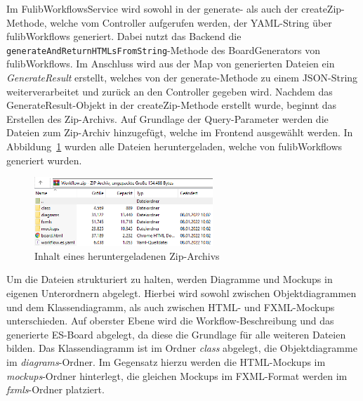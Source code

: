 Im FulibWorkflowsService wird sowohl in der generate- als auch der createZip-Methode, welche vom Controller aufgerufen werden,
der YAML-String über fulibWorkflows generiert.
Dabei nutzt das Backend die \texttt{generateAndReturnHTMLsFromString}-Methode des BoardGenerators von fulibWorkflows.
Im Anschluss wird aus der Map von generierten Dateien ein \textit{GenerateResult} erstellt, welches von der generate-Methode zu einem JSON-String weiterverarbeitet und zurück an den Controller gegeben wird.
Nachdem das GenerateResult-Objekt in der createZip-Methode erstellt wurde, beginnt das Erstellen des Zip-Archivs.
Auf Grundlage der Query-Parameter werden die Dateien zum Zip-Archiv hinzugefügt, welche im Frontend ausgewählt werden.
In Abbildung~\ref{fig:export} wurden alle Dateien heruntergeladen, welche von fulibWorkflows generiert wurden.

\begin{figure}[h]
    \centering
    \includegraphics[width=0.6\textwidth]{images/3.3/export}
    \caption{Inhalt eines heruntergeladenen Zip-Archivs}
    \label{fig:export}
\end{figure}

Um die Dateien strukturiert zu halten, werden Diagramme und Mockups in eigenen Unterordnern abgelegt.
Hierbei wird sowohl zwischen Objektdiagrammen und dem Klassendiagramm, als auch zwischen HTML- und FXML-Mockups unterschieden.
Auf oberster Ebene wird die Workflow-Beschreibung und das generierte \ac{ES}-Board abgelegt, da diese
die Grundlage für alle weiteren Dateien bilden.
Das Klassendiagramm ist im Ordner \textit{class} abgelegt, die Objektdiagramme im \textit{diagrams}-Ordner.
Im Gegensatz hierzu werden die HTML-Mockups im \textit{mockups}-Ordner hinterlegt, die gleichen Mockups im FXML-Format werden
im \textit{fxmls}-Ordner platziert.
